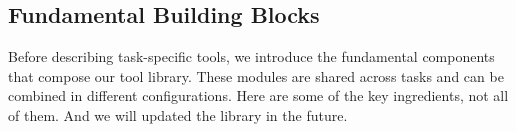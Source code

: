 


\subsection{Fundamental Building Blocks}
\label{appx:component_taxonomy}

Before describing task-specific tools, we introduce the fundamental components that compose our tool library. These modules are shared across tasks and can be combined in different configurations. Here are some of the key ingredients, not all of them. And we will updated the library in the future.

